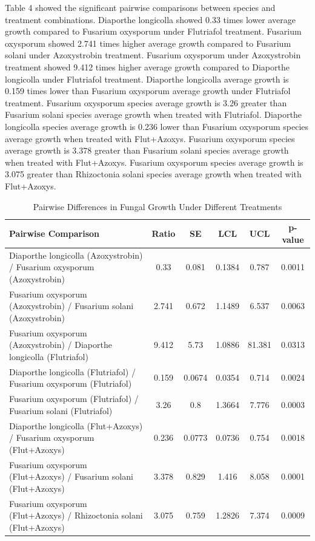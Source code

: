 \documentclass[
  10pt,
  letterpaper,
  twocolumn]{article}
\begin{document}
Table 4 showed the significant pairwise comparisons between species and
treatment combinations. Diaporthe longicolla showed 0.33 times lower
average growth compared to Fusarium oxysporum under Flutriafol
treatment. Fusarium oxysporum showed 2.741 times higher average growth
compared to Fusarium solani under Azoxystrobin treatment. Fusarium
oxysporum under Azoxystrobin treatment showed 9.412 times higher average
growth compared to Diaporthe longicolla under Flutriafol treatment.
Diaporthe longicolla average growth is 0.159 times lower than Fusarium
oxysporum average growth under Flutriafol treatment. Fusarium oxysporum
species average growth is 3.26 greater than Fusarium solani species
average growth when treated with Flutriafol. Diaporthe longicolla
species average growth is 0.236 lower than Fusarium oxysporum species
average growth when treated with Flut+Azoxys. Fusarium oxysporum species
average growth is 3.378 greater than Fusarium solani species average
growth when treated with Flut+Azoxys. Fusarium oxysporum species average
growth is 3.075 greater than Rhizoctonia solani species average growth
when treated with Flut+Azoxys.

\begin{table}[ht]
\centering
{}
\caption{Pairwise Differences in Fungal Growth Under Different Treatments}
\begin{tabular}{|p{8cm}|c|c|c|c|c|}
\hline
\textbf{Pairwise Comparison} & \textbf{Ratio} & \textbf{SE} & \textbf{LCL} & \textbf{UCL} & \textbf{p-value} \\
\hline
Diaporthe longicolla (Azoxystrobin) / Fusarium oxysporum (Azoxystrobin) & 0.33 & 0.081 & 0.1384 & 0.787 & 0.0011 \\
Fusarium oxysporum (Azoxystrobin) / Fusarium solani (Azoxystrobin) & 2.741 & 0.672 & 1.1489 & 6.537 & 0.0063 \\
Fusarium oxysporum (Azoxystrobin) / Diaporthe longicolla (Flutriafol) & 9.412 & 5.73 & 1.0886 & 81.381 & 0.0313 \\
Diaporthe longicolla (Flutriafol) / Fusarium oxysporum (Flutriafol) & 0.159 & 0.0674 & 0.0354 & 0.714 & 0.0024 \\
Fusarium oxysporum (Flutriafol) / Fusarium solani (Flutriafol) & 3.26 & 0.8 & 1.3664 & 7.776 & 0.0003 \\
Diaporthe longicolla (Flut+Azoxys) / Fusarium oxysporum (Flut+Azoxys) & 0.236 & 0.0773 & 0.0736 & 0.754 & 0.0018 \\
Fusarium oxysporum (Flut+Azoxys) / Fusarium solani (Flut+Azoxys) & 3.378 & 0.829 & 1.416 & 8.058 & 0.0001 \\
Fusarium oxysporum (Flut+Azoxys) / Rhizoctonia solani (Flut+Azoxys) & 3.075 & 0.759 & 1.2826 & 7.374 & 0.0009 \\
\hline
\end{tabular}
\end{table}
\end{document}
